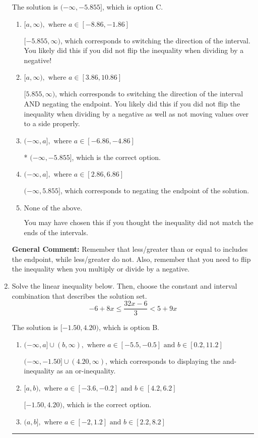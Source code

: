 \documentclass{extbook}[14pt]
\newcommand{\litem}[1]{\item #1

\rule{\textwidth}{0.4pt}}
\begin{document}
\begin{enumerate}
{The solution is \( (-\infty, -5.855] \), which is option C.\begin{enumerate}[label=\Alph*.]
\item \( [a, \infty), \text{ where } a \in [-8.86, -1.86] \)

 $[-5.855, \infty)$, which corresponds to switching the direction of the interval. You likely did this if you did not flip the inequality when dividing by a negative!
\item \( [a, \infty), \text{ where } a \in [3.86, 10.86] \)

 $[5.855, \infty)$, which corresponds to switching the direction of the interval AND negating the endpoint. You likely did this if you did not flip the inequality when dividing by a negative as well as not moving values over to a side properly.
\item \( (-\infty, a], \text{ where } a \in [-6.86, -4.86] \)

* $(-\infty, -5.855]$, which is the correct option.
\item \( (-\infty, a], \text{ where } a \in [2.86, 6.86] \)

 $(-\infty, 5.855]$, which corresponds to negating the endpoint of the solution.
\item \( \text{None of the above}. \)

You may have chosen this if you thought the inequality did not match the ends of the intervals.
\end{enumerate}

\textbf{General Comment:} Remember that less/greater than or equal to includes the endpoint, while less/greater do not. Also, remember that you need to flip the inequality when you multiply or divide by a negative.
}
\litem{
Solve the linear inequality below. Then, choose the constant and interval combination that describes the solution set.
\[ -6 + 8 x \leq \frac{32 x - 6}{3} < 5 + 9 x \]

The solution is \( [-1.50, 4.20) \), which is option B.\begin{enumerate}[label=\Alph*.]
\item \( (-\infty, a] \cup (b, \infty), \text{ where } a \in [-5.5, -0.5] \text{ and } b \in [0.2, 11.2] \)

$(-\infty, -1.50] \cup (4.20, \infty)$, which corresponds to displaying the and-inequality as an or-inequality.
\item \( [a, b), \text{ where } a \in [-3.6, -0.2] \text{ and } b \in [4.2, 6.2] \)

$[-1.50, 4.20)$, which is the correct option.
\item \( (a, b], \text{ where } a \in [-2, 1.2] \text{ and } b \in [2.2, 8.2] \)


\end{enumerate}}
\end{enumerate}
\end{document}
